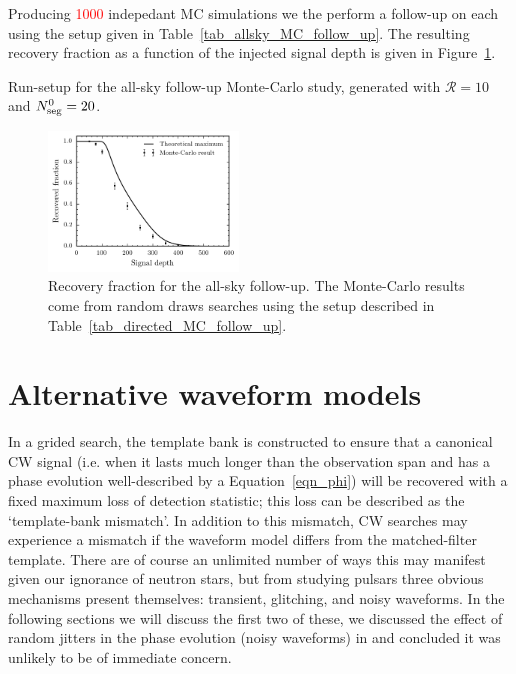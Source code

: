 \documentclass[aps, prd, twocolumn, superscriptaddress, floatfix, showpacs, nofootinbib, longbibliography]{revtex4-1}
\newcommand{\CHECK}[1]{\textcolor{red}{#1}}
\begin{document}
Producing \CHECK{1000} indepedant MC simulations we the perform a follow-up on
each using the setup given in Table~\ref{tab_allsky_MC_follow_up}. The
resulting recovery fraction as a function of the injected signal depth is given
in Figure~\ref{fig_allsky_MC_follow_up}.

\begin{table}[htb]
\caption{Run-setup for the all-sky follow-up Monte-Carlo study, generated with
$\mathcal{R}=10$ and $N_{\rm seg}^0=20$.}
\label{tab_allsky_MC_follow_up}

\end{table}

\begin{figure}[htb]
\centering
\includegraphics[width=0.45\textwidth]{allsky_recovery}
\caption{Recovery fraction for the all-sky follow-up. The Monte-Carlo results
come from random draws searches using the setup described in
Table~\ref{tab_directed_MC_follow_up}.}
\label{fig_allsky_MC_follow_up}
\end{figure}

\section{Alternative waveform models}

In a grided search, the template bank is constructed to ensure that a canonical
CW signal (i.e. when it lasts much longer than the observation span and has a
phase evolution well-described by a Equation~\eqref{eqn_phi}) will be
recovered with a fixed maximum loss of detection statistic; this loss can be
described as the `template-bank mismatch'. In addition to this mismatch, CW
searches may experience a mismatch if the waveform model differs from the
matched-filter template. There are of course an unlimited number of ways this
may manifest given our ignorance of neutron stars, but from studying pulsars
three obvious mechanisms present themselves: transient, glitching, and noisy
waveforms. In the following sections we will discuss the first two of these, we
discussed the effect of random jitters in the phase evolution (noisy waveforms)
in \citet{ashton2015} and concluded it was unlikely to be of immediate concern.
\end{document}
